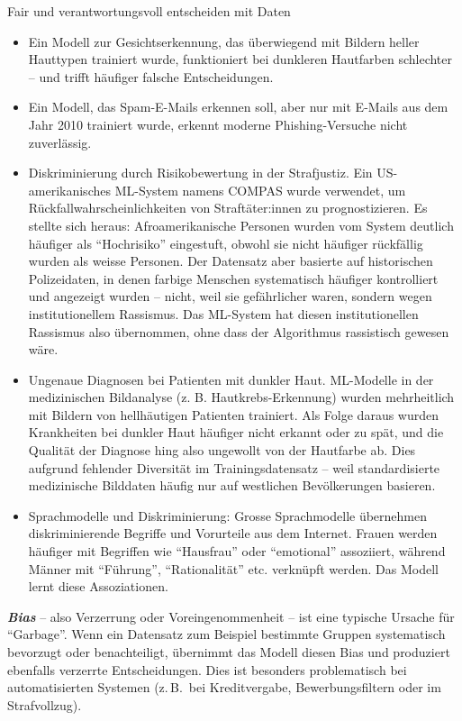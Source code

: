 \begin{lpu}{Fair und verantwortungsvoll entscheiden mit Daten}
\begin{itemize}
  \item Ein Modell zur Gesichtserkennung, das überwiegend mit Bildern heller Hauttypen trainiert wurde, funktioniert bei dunkleren Hautfarben schlechter – und trifft häufiger falsche Entscheidungen.
  \item Ein Modell, das Spam-E-Mails erkennen soll, aber nur mit E-Mails aus dem Jahr 2010 trainiert wurde, erkennt moderne Phishing-Versuche nicht zuverlässig.
  \item Diskriminierung durch Risikobewertung in der Strafjustiz. Ein US-amerikanisches ML-System namens COMPAS wurde verwendet, um Rückfallwahrscheinlichkeiten von Straftäter:innen zu prognostizieren. Es stellte sich heraus: Afroamerikanische Personen wurden vom System deutlich häufiger als ``Hochrisiko'' eingestuft, obwohl sie nicht häufiger rückfällig wurden als weisse Personen. Der Datensatz aber basierte auf historischen Polizeidaten, in denen farbige Menschen systematisch häufiger kontrolliert und angezeigt wurden – nicht, weil sie gefährlicher waren, sondern wegen institutionellem Rassismus. Das ML-System hat diesen institutionellen Rassismus also übernommen, ohne dass der Algorithmus rassistisch gewesen wäre.
  \item{Ungenaue Diagnosen bei Patienten mit dunkler Haut}. ML-Modelle in der medizinischen Bildanalyse (z. B. Hautkrebs-Erkennung) wurden mehrheitlich mit Bildern von hellhäutigen Patienten trainiert. Als Folge daraus wurden Krankheiten bei dunkler Haut häufiger nicht erkannt oder zu spät, und die Qualität der Diagnose hing also ungewollt von der Hautfarbe ab. Dies aufgrund fehlender Diversität im Trainingsdatensatz – weil standardisierte medizinische Bilddaten häufig nur auf westlichen Bevölkerungen basieren.
  \item{Sprachmodelle und Diskriminierung}: Grosse Sprachmodelle übernehmen diskriminierende Begriffe und Vorurteile aus dem Internet. Frauen werden häufiger mit Begriffen wie ``Hausfrau'' oder ``emotional'' assoziiert, während Männer mit ``Führung'', ``Rationalität'' etc. verknüpft werden. Das Modell lernt diese Assoziationen. 
\end{itemize}

\begin{theorie}
\textbf{\textit{Bias}} – also Verzerrung oder Voreingenommenheit – ist eine typische Ursache für ``Garbage''. Wenn ein Datensatz zum Beispiel bestimmte Gruppen systematisch bevorzugt oder benachteiligt, übernimmt das Modell diesen Bias und produziert ebenfalls verzerrte Entscheidungen. Dies ist besonders problematisch bei automatisierten Systemen (z.\,B.\ bei Kreditvergabe, Bewerbungsfiltern oder im Strafvollzug).
\end{theorie}


\end{lpu}
